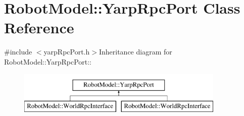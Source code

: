 \hypertarget{class_robot_model_1_1_yarp_rpc_port}{
\section{RobotModel::YarpRpcPort Class Reference}
\label{class_robot_model_1_1_yarp_rpc_port}
}


{\ttfamily \#include $<$yarpRpcPort.h$>$}Inheritance diagram for RobotModel::YarpRpcPort::\begin{figure}[H]
\begin{center}
\leavevmode
\includegraphics[height=2cm]{class_robot_model_1_1_yarp_rpc_port}
\end{center}
\end{figure}
